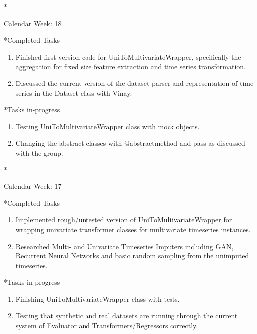 \documentclass[11pt,a4paper]{article}
\begin{document}
\newpage
\begin{section}*{Calendar Week: 18 \hfill \date{07 May, 2021}}
	
	\begin{subsection}*{Completed Tasks}
		\begin{enumerate}
			\item Finished first version code for UniToMultivariateWrapper, specifically the aggregation for fixed size feature extraction and time series transformation.
			\item Discussed the current version of the dataset parser and representation of time series in the Dataset class with Vinay.
		\end{enumerate}
	\end{subsection}
	
	\begin{subsection}*{Tasks in-progress}
		\begin{enumerate}
			\item Testing UniToMultivariateWrapper class with mock objects.
			\item Changing the abstract classes with @abstractmethod and pass as discussed with the group.
		\end{enumerate}
	\end{subsection}
	
\end{section}

\newpage
\begin{section}*{Calendar Week: 17 \hfill \date{30 April, 2021}}
	
	\begin{subsection}*{Completed Tasks}
		\begin{enumerate}
			\item Implemented rough/untested version of UniToMultivariateWrapper for wrapping univariate transformer classes for multivariate timeseries instances.
			\item Researched Multi- and Univariate Timeseries Imputers including GAN, Recurrent Neural Networks and basic random sampling from the unimputed timeseries.
		\end{enumerate}
	\end{subsection}
	
	\begin{subsection}*{Tasks in-progress}
		\begin{enumerate}
			\item Finishing UniToMultivariateWrapper class with tests.
			\item Testing that synthetic and real datasets are running through the current system of Evaluator and Transformers/Regressors correctly.
		\end{enumerate}
	\end{subsection}
	
\end{section}
\end{document}

